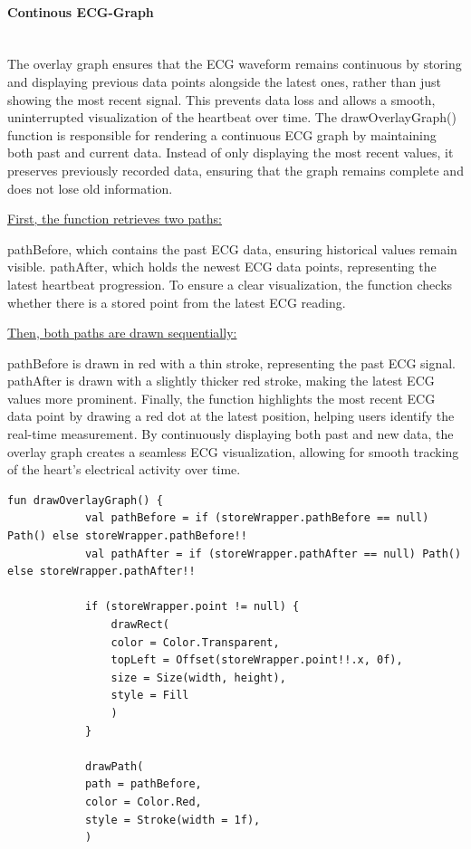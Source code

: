 {{	\paragraph{Continous ECG-Graph}\mbox{}\\
	The overlay graph ensures that the ECG waveform remains continuous by storing and displaying previous data points alongside the latest ones, rather than just showing the most recent signal. This prevents data loss and allows a smooth, uninterrupted visualization of the heartbeat over time.
	The drawOverlayGraph() function is responsible for rendering a continuous ECG graph by maintaining both past and current data. Instead of only displaying the most recent values, it preserves previously recorded data, ensuring that the graph remains complete and does not lose old information.
	
	\underline{First, the function retrieves two paths:}
	
	pathBefore, which contains the past ECG data, ensuring historical values remain visible.
	pathAfter, which holds the newest ECG data points, representing the latest heartbeat progression.
	To ensure a clear visualization, the function checks whether there is a stored point from the latest ECG reading. 
	
	\underline{Then, both paths are drawn sequentially:}
	
	pathBefore is drawn in red with a thin stroke, representing the past ECG signal.
	pathAfter is drawn with a slightly thicker red stroke, making the latest ECG values more prominent.
	Finally, the function highlights the most recent ECG data point by drawing a red dot at the latest position, helping users identify the real-time measurement. By continuously displaying both past and new data, the overlay graph creates a seamless ECG visualization, allowing for smooth tracking of the heart’s electrical activity over time.
	\begin{lstlisting}[label={fig:simpleSourceGen.cs}, caption={Code to draw the prepared Overlaygraph}]
		fun drawOverlayGraph() {
			val pathBefore = if (storeWrapper.pathBefore == null) Path() else storeWrapper.pathBefore!!
			val pathAfter = if (storeWrapper.pathAfter == null) Path() else storeWrapper.pathAfter!!
			
			if (storeWrapper.point != null) {
				drawRect(
				color = Color.Transparent,
				topLeft = Offset(storeWrapper.point!!.x, 0f),
				size = Size(width, height),
				style = Fill
				)
			}
			
			drawPath(
			path = pathBefore,
			color = Color.Red,
			style = Stroke(width = 1f),
			)
			

\end{lstlisting}}}
